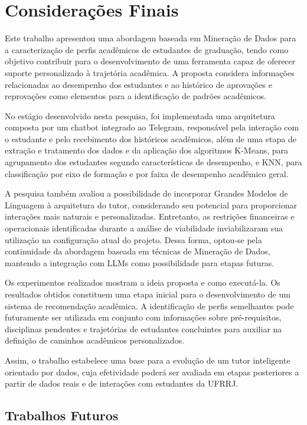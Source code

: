 \section{Considerações Finais}

Este trabalho apresentou uma abordagem baseada em Mineração de Dados para a caracterização de perfis acadêmicos de estudantes de graduação, tendo como objetivo contribuir para o desenvolvimento de uma ferramenta capaz de oferecer suporte personalizado à trajetória acadêmica. A proposta considera informações relacionadas ao desempenho dos estudantes e ao histórico de aprovações e reprovações como elementos para a identificação de padrões acadêmicos.

No estágio desenvolvido nesta pesquisa, foi implementada uma arquitetura composta por um chatbot integrado ao Telegram, responsável pela interação com o estudante e pelo recebimento dos históricos acadêmicos, além de uma etapa de extra\c{c}\~ao e tratamento dos dados e da
aplica\c{c}\~ao dos algoritmos K-Means, para agrupamento dos estudantes
segundo caracter\'isticas de desempenho, e KNN, para classifica\c{c}\~ao
por eixo de forma\c{c}\~ao e por faixa de desempenho acad\^emico geral.

A pesquisa também avaliou a possibilidade de incorporar Grandes Modelos de Linguagem à arquitetura do tutor, considerando seu potencial para proporcionar interações mais naturais e personalizadas. Entretanto, as restrições financeiras e operacionais identificadas durante a análise de viabilidade inviabilizaram sua utilização na configuração atual do projeto. Dessa forma, optou-se pela continuidade da abordagem baseada em técnicas de Mineração de Dados, mantendo a integração com LLMs como possibilidade para etapas futuras.

Os experimentos realizados mostram a ideia proposta e como executá-la. Os resultados obtidos constituem uma etapa inicial para o desenvolvimento de um sistema de recomendação acadêmica. A identificação de perfis semelhantes pode futuramente ser utilizada em conjunto com informações sobre pré-requisitos, disciplinas pendentes e trajetórias de estudantes concluintes para auxiliar na definição de caminhos acadêmicos personalizados.

Assim, o trabalho estabelece uma base para a evolução de um tutor inteligente orientado por dados, cuja efetividade poderá ser avaliada em etapas posteriores a partir de dados reais e de interações com estudantes da UFRRJ.

\subsection{Trabalhos Futuros}
\label{sec:trabalhos_futuros}

